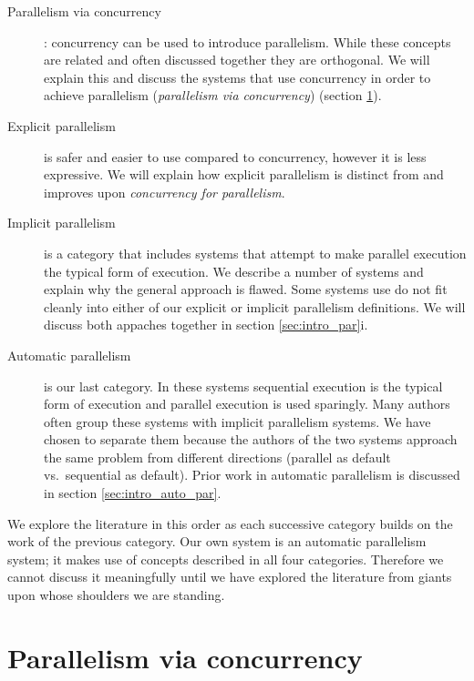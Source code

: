 \begin{description}
    \item[Parallelism via concurrency]:
    concurrency can be used to introduce parallelism.
    While these concepts are related and often discussed together they are
    orthogonal.
    We will explain this and discuss the systems that use concurrency in
    order to achieve parallelism (\emph{parallelism via concurrency})
    (section \ref{sec:intro_concurrency}).

    \item[Explicit parallelism] is safer and easier to use compared to
    concurrency, however it is less expressive.
    We will explain how explicit parallelism is distinct from and improves
    upon \emph{concurrency for parallelism}.
    
    \item[Implicit parallelism] is a category that includes 
    systems that attempt to make parallel execution the typical form of
    execution.
    We describe a number of systems and explain why the general approach is
    flawed.
    Some systems use do not fit cleanly into either of our explicit
    or implicit parallelism definitions.
    We will discuss both appaches together in section
    \ref{sec:intro_par}i.

    \item[Automatic parallelism] is our last category.
    In these systems sequential execution is the typical form of execution
    and parallel execution is used sparingly.
    Many authors often group these systems with implicit parallelism systems.
    We have chosen to separate them because the authors of the two systems
    approach the same problem from different directions
    (parallel as default vs.\ sequential as default).
    Prior work in automatic parallelism is discussed in section
    \ref{sec:intro_auto_par}.
\end{description}    

\noindent
We explore the literature in this order as each successive category builds
on the work of the previous category.
Our own system is an automatic parallelism system;
it makes use of concepts described in all four categories.
Therefore
we cannot discuss it meaningfully until we have explored the literature
from giants upon whose shoulders we are standing.


\section{Parallelism via concurrency}
\label{sec:intro_concurrency}

